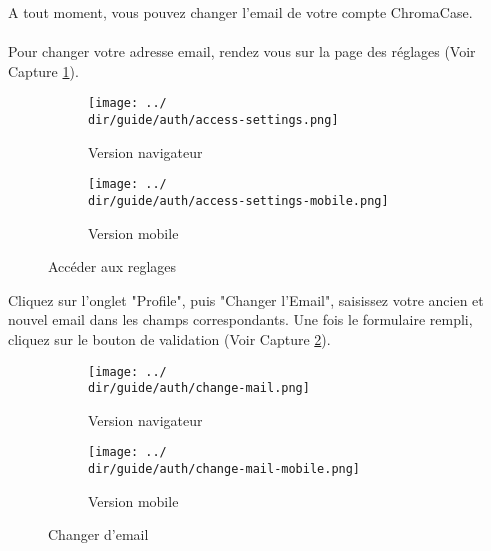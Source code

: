 A tout moment, vous pouvez changer l’email de votre compte ChromaCase.
\\\\
Pour changer votre adresse email, rendez vous sur la page des réglages (Voir Capture \ref{fig:access-settings-mail}).

\begin{figure}[H]
	\begin{subfigure}[b]{0.7\textwidth}
		\texttt{[image: ../\\dir/guide/auth/access-settings.png]}
		\caption{Version navigateur}
	\end{subfigure}
	\begin{subfigure}[b]{0.25\textwidth}
		\texttt{[image: ../\\dir/guide/auth/access-settings-mobile.png]}
		\caption{Version mobile}
	\end{subfigure}
	\caption{Accéder aux reglages}
	\label{fig:access-settings-mail}
\end{figure}

Cliquez sur l'onglet "Profile", puis "Changer l'Email", saisissez votre ancien et nouvel email dans les champs correspondants. Une fois le formulaire rempli, cliquez sur le bouton de validation (Voir Capture \ref{fig:change-mail}).

\begin{figure}[H]
	\begin{subfigure}[b]{0.7\textwidth}
		\texttt{[image: ../\\dir/guide/auth/change-mail.png]}
		\caption{Version navigateur}
	\end{subfigure}
	\begin{subfigure}[b]{0.25\textwidth}
		\texttt{[image: ../\\dir/guide/auth/change-mail-mobile.png]}
		\caption{Version mobile}
	\end{subfigure}
	\caption{Changer d'email}
	\label{fig:change-mail}
\end{figure}